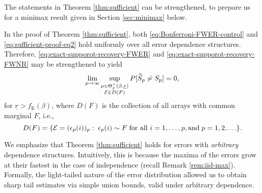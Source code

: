 The statements in Theorem \ref{thm:sufficient} can be strengthened, to prepare us for a minimax result given in Section \ref{sec:minimax} below.

\begin{remark} \label{rmk:sufficient-strengthened}
In the proof of Theorem \ref{thm:sufficient}, both \eqref{eq:Bonferroni-FWER-control} and \eqref{eq:sufficient-proof-eq2} hold uniformly over all error dependence structures.
Therefore, \eqref{eq:exact-supporot-recovery-FWER} and \eqref{eq:exact-supporot-recovery-FWNR} may be strengthened to yield
\begin{equation} \label{eq:exact-supporot-recovery-strengthened}
    \lim_{p\to\infty}\sup_{\substack{\mu\in\Theta_p^+(\beta, \underline{r})\\ {\cal E}\in D(F)}} P[\widehat{S}_p \neq S_p] = 0,
\end{equation}
for $\underline{r} > f_{\mathrm{E}}(\beta)$, where $D(F)$ is the collection of all arrays with common marginal $F$, i.e., 
\begin{equation} \label{eq:common-marginal-distribution}
    D(F)=\{{\cal E}=(\epsilon_p(i))_p:\;\epsilon_p(i)\sim F\;\text{for all }i=1,\ldots,p, \text{and}\; p=1,2,\ldots\}.
\end{equation}
\end{remark}

\begin{remark}
We emphasize that Theorem \ref{thm:sufficient} holds for errors with \emph{arbitrary} dependence structures. 
Intuitively, this is because the maxima of the errors grow at their fastest in the case of independence (recall Remark \ref{rem:iid-max}). 
Formally, the light-tailed nature of the error distribution allowed us to obtain sharp tail estimates via simple union bounds, 
valid under arbitrary dependence.
\end{remark}


